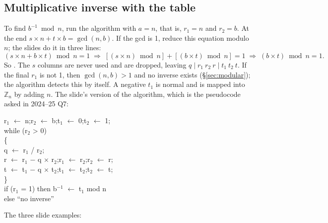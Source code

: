 \subsection{Multiplicative inverse with the table \hothot}
To find $b^{-1} \bmod n$, run the algorithm with $a = n$, that is, $r_1 = n$ and $r_2 = b$. At the end $s \times n + t \times b = \gcd(n, b)$. If the gcd is 1, reduce this equation modulo $n$; the slides do it in three lines:
\[
(s \times n + b \times t) \bmod n = 1 \;\Rightarrow\; [(s \times n) \bmod n] + [(b \times t) \bmod n] = 1 \;\Rightarrow\; (b \times t) \bmod n = 1 .
\]
So . The $s$ columns are never used and are dropped, leaving $q \mid r_1\ r_2\ r \mid t_1\ t_2\ t$. If the final $r_1$ is not 1, then $\gcd(n, b) > 1$ and no inverse exists (\S\ref{sec:modular}); the algorithm detects this by itself. A negative $t_1$ is normal and is mapped into $\mathbb{Z}_n$ by adding $n$. The slide's version of the algorithm, which is the pseudocode asked in 2024--25 Q7:
\begin{center}
\begin{minipage}{0.56\textwidth}
\small\ttfamily
r$_1$ $\leftarrow$ n;\quad r$_2$ $\leftarrow$ b;\quad t$_1$ $\leftarrow$ 0;\quad t$_2$ $\leftarrow$ 1;\\
while (r$_2$ > 0)\\
\{\\
\hspace*{1.5em}q $\leftarrow$ r$_1$ / r$_2$;\\
\hspace*{1.5em}r $\leftarrow$ r$_1$ $-$ q $\times$ r$_2$;\quad r$_1$ $\leftarrow$ r$_2$;\quad r$_2$ $\leftarrow$ r;\\
\hspace*{1.5em}t $\leftarrow$ t$_1$ $-$ q $\times$ t$_2$;\quad t$_1$ $\leftarrow$ t$_2$;\quad t$_2$ $\leftarrow$ t;\\
\}\\
if (r$_1$ = 1) then b$^{-1}$ $\leftarrow$ t$_1$ mod n\\
else ``no inverse''
\end{minipage}
\end{center}
The three slide examples:

